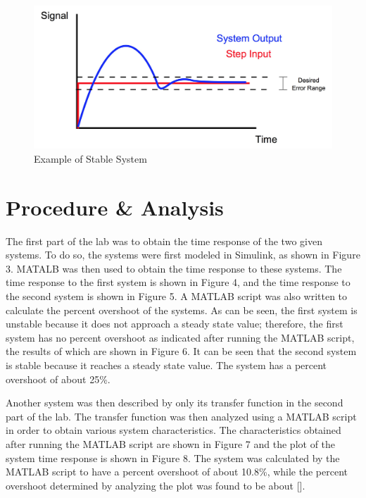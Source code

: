 \documentclass[12pt]{article}
\begin{document}
\bigskip
\bigskip

\begin{figure}[h!] %
   \centering
   \includegraphics[width=\linewidth]{stable_system.JPG} 
   \caption{Example of Stable System}
   \label{fig:example}
\end{figure}

\bigskip

\section*{\fontsize{12}{12}\selectfont \large Procedure \& Analysis}
The first part of the lab was to obtain the time response of the two given systems. To do so, the systems were first modeled in Simulink, as shown in Figure 3. MATALB was then used to obtain the time response to these systems. The time response to the first system is shown in Figure 4, and the time response to the second system is shown in Figure 5. A MATLAB script was also written to calculate the percent overshoot of the systems. As can be seen, the first system is unstable because it does not approach a steady state value; therefore, the first system has no percent overshoot as indicated after running the MATLAB script, the results of which are shown in Figure 6. It can be seen that the second system is stable because it reaches  a steady state value. The system has a percent overshoot of about 25\%.
\bigskip

Another system was then described by only its transfer function in the second part of the lab. The transfer function was then analyzed using a MATLAB script in order to obtain various system characteristics. The characteristics obtained after running the MATLAB script are shown in Figure 7 and the plot of the system time response is shown in Figure 8. The system was calculated by the MATLAB script to have a percent overshoot of about 10.8\%, while the percent overshoot determined by analyzing the plot was found to be about [].
\newpage
\end{document}

